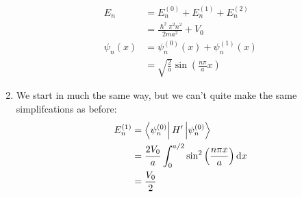 \documentclass[a4paper]{article}
\begin{document}
\begin{eg}
\begin{enumerate}
\begin{align*}
			E_n &= E_n^{(0)} + E_n^{(1)} + E_n^{(2)}\\
			    &= \frac{\hslash^2 \pi^2 n^2}{2 m a^2} + V_0\\
			\psi_n(x) &= \psi_n^{(0)}(x) + \psi_n^{(1)}(x)\\
				  &= \sqrt{\frac{2}{a}}
					\sin\left(\frac{n\pi}{a}x\right)
		\end{align*}
	\item
		We start in much the same way, but we can't quite make the
		same simplifcations as before:
		\begin{align*}
			E_n^{(1)}&=\left\langle \psi_n^{(0)} \right\rvert H' \left\lvert \psi_n^{(0)}\right\rangle\\
				 &= \frac{2V_0}{a}\int_0^{a/2}\sin^2\left(
					\frac{n\pi x}{a}\right) \mathrm{d} x\\
					&= \frac{V_0}{2}
		\end{align*}
	\end{enumerate}
\end{eg}
\end{document}
